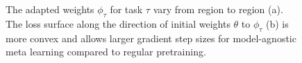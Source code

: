 \begin{figure}
		
		
		
		


	\ifdefined\reducecaptionspace
	\setlength{\belowcaptionskip}{-15pt}
	\fi
	
	\caption{The adapted weights $\phi_\tau$ for task $\tau$ vary from region to region (a). The loss surface along the direction of initial weights $\theta$ to $\phi_\tau$ (b) is more convex and allows larger gradient step sizes for model-agnostic meta learning compared to regular pretraining.}
	\label{fig:adaptation}
\end{figure}